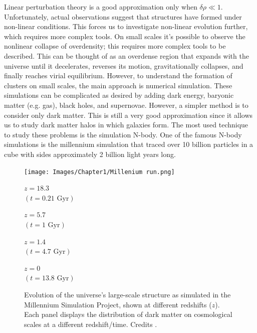 Linear perturbation theory is a good approximation only when $\delta \rho \ll 1$.
Unfortunately, actual observations suggest that structures have formed under non-linear conditions.
This forces us to investigate non-linear evolution further, which requires more complex tools.
On small scales it's possible to observe the nonlinear collapse of overdensity; this requires more complex tools to be described. This can be thought of as an overdense region that expands with the universe until it decelerates, reverses its motion, gravitationally collapses, and finally reaches virial equilibrium.
However, to understand the formation of clusters on small scales, the main approach is numerical simulation. 
These simulations can be complicated as desired by adding dark energy, baryonic matter (e.g. gas), black holes, and supernovae. However, a simpler method is to consider only dark matter. This is still a very good approximation since it allows us to study dark matter halos in which galaxies form.
The most used technique to study these problems is the simulation N-body. One of the famous N-body simulations is the millennium simulation that traced over 10 billion particles in a cube with sides approximately 2 billion light years long.
\begin{figure}[h!]
    \centering
    \texttt{[image: Images/Chapter1/Millenium run.png]}

    \vspace{2mm} %
    \begin{minipage}[t]{0.24\textwidth}
        \centering
        $z = 18.3$\\ $(t = 0.21\text{ Gyr})$
    \end{minipage}
    \begin{minipage}[t]{0.24\textwidth}
        \centering
        $z = 5.7$\\ $(t = 1 \text{ Gyr})$
    \end{minipage}
    \begin{minipage}[t]{0.24\textwidth}
        \centering
        $z = 1.4$\\ $(t = 4.7\text{ Gyr})$
    \end{minipage}
    \begin{minipage}[t]{0.24\textwidth}
        \centering
        $z = 0$\\ $(t = 13.8\text{ Gyr})$
    \end{minipage}

    \caption[Millenium simulation of cosmic structure]{
        Evolution of the universe’s large-scale structure as simulated in the Millennium Simulation Project, shown at different redshifts ($z$). Each panel displays the distribution of dark matter on cosmological scales at a different redshift/time. Credits \cite{millennium_simulation}.}
    \label{fig:scala_cosmica_unificata}
\end{figure}

